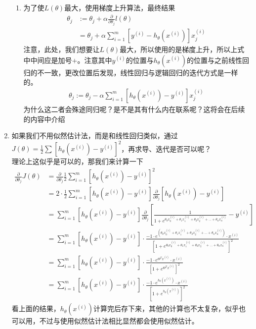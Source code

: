\begin{enumerate}
\begin{enumerate}
			\item 为了使$L(\theta)$最大，使用梯度上升算法，最终结果
			\begin{align}
				\theta_j &:= \theta_j + \alpha \frac{\partial}{\partial \theta_j}l(\theta) \\
				&=  \theta_j + \alpha \sum_{i=1}^{m} \left[ y^{(i)} - h_\theta(x^{(i)}) \right]x_j^{(i)}
			\end{align}
			注意，此处，我们想要让$L(\theta)$最大，所以使用的是梯度上升，所以上式中中间应是加号$+$。注意其中$y^{(i)}$的位置与$h_\theta(x^{(i)})$的位置与之前线性回归的不一致，更改位置后发现，线性回归与逻辑回归的迭代方式是一样的。
			\begin{align}
				\theta_j :=  \theta_j - \alpha \sum_{i=1}^{m} \left[h_\theta(x^{(i)}) - y^{(i)} \right]x_j^{(i)}
			\end{align}
			为什么这二者会殊途同归呢？是不是其有什么内在联系呢？这将会在后续的内容中介绍
			\end{enumerate}

		\item 如果我们不用似然估计法，而是和线性回归类似，通过$J(\theta) = \frac{1}{2} \sum_{}^{} \left[h_\theta(x^{(i)}) - y^{(i)}\right]^2$，再求导、迭代是否可以呢？\\
		理论上这似乎是可以的，那我们来计算一下
		\begin{align}
			\frac{\partial} {\partial \theta_j} J(\theta) &= \frac{\partial}{\partial \theta_j} \frac{1}{2} \sum_{i=1}^m\left[ h_\theta(x^{(i)}) - y^{(i)} \right]^2 \\
		      &= 2 \cdot \frac{1}{2} \sum_{i=1}^m\left[ h_\theta(x^{(i)}) - y^{(i)} \right] \frac{\partial}{\partial\theta_j}\left[ h_\theta(x^{(i)}) - y^{(i)} \right] \\
		      &= \sum_{i=1}^m\left[ h_\theta(x^{(i)}) - y^{(i)} \right]\frac{\partial}{\partial\theta_j}\left[ \frac{1}{1+e^{\theta_0x_0^{(i)} +  \theta_1x_1^{(i)} + \theta_2x_2^{(i)} + ... + \theta_nx_n^{(i)}} } - y^{(i)} \right] \\
		      &= \sum_{i=1}^m\left[ h_\theta(x^{(i)}) - y^{(i)} \right] \cdot \frac{-1\cdot e^{(\theta_0x_0^{(i)}+ \theta_1x_1^{(i)} + \theta_2x_2^{(i)} + ... + \theta_nx_n^{(i)})}\cdot x^{(i)}}{\left[1+e^{\theta_0x_0^{(i)} +  \theta_1x_1^{(i)} + \theta_2x_2^{(i)} + ... + \theta_nx_n^{(i)}}\right]^2} \\
		      &= \sum_{i=1}^m\left[ h_\theta(x^{(i)}) - y^{(i)} \right] \cdot \frac{-1\cdot e^{\Theta^Tx^{(i)}}\cdot x^{(i)}}{\left[1 + e^{\Theta^Tx^{(i)}}\right]^2} \\
		      &= \sum_{i=1}^m\left[ h_\theta(x^{(i)}) - y^{(i)} \right] \cdot \frac{-1\cdot e^{h_\theta(x^{(i)})}\cdot x^{(i)}}{\left[1 + e^{h_\theta(x^{(i)})}\right]^2}
		\end{align}
		看上面的结果，$h_\theta(x^{(i)})$计算完后存下来，其他的计算也不太复杂，似乎也可以用，不过与使用似然估计法相比显然都会使用似然估计。

\end{enumerate}

